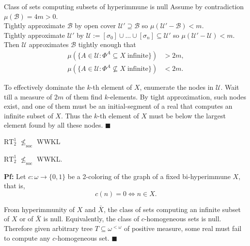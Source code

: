 \begin{frame}{Class of sets computing subsets of hyperimmune is null}
  Assume by contradiction $\mu(\mathcal{B})=4m>0$.\\
  Tightly approximate $\mathcal{B}$ by open cover
  $\mathcal{U}'\supseteq\mathcal{B}$ so
  $\mu(\mathcal{U}'-\mathcal{B})<m$.\\
  Tightly approximate $\mathcal{U}'$ by $\mathcal{U} :=[\sigma_0] \cup
  \ldots\cup[\sigma_n] \subseteq\mathcal{U}'$ so
  $\mu(\mathcal{U}'-\mathcal{U}) <m$.\\
  Then $\mathcal{U}$ approximates $\mathcal{B}$ tightly enough that
  \begin{align*}
    \mu(\{A\in\mathcal{U}: \Phi^A \subseteq X\; \text{infinite}\}) &>2m,\\
    \mu(\{A\in\mathcal{U}: \Phi^A \not\subseteq X\; \text{infinite}\}) &<2m.
  \end{align*}

  To effectively dominate the $k$-th element of $X$, enumerate the nodes in
  $\mathcal{U}$. Wait till a measure of $2m$ of them find $k$-elements. By
  tight approximation, such nodes exist, and one of them must be an
  initial-segment of a real that computes an infinite subset of $X$. Thus
  the $k$-th element of $X$ must be below the largest element found by all
  these nodes. $\blacksquare$
\end{frame}

\begin{frame}{$\text{RT}_2^1$ $\nleq_{\text{soc}}$ WWKL}
  \begin{thm}
    $\text{RT}_2^1$ $\nleq_{\text{soc}}$ WWKL.
  \end{thm}

  \vspace{1em}
  \textbf{Pf:} Let $c:\omega\rightarrow\{0,1\}$ be a 2-coloring of the
  graph of a fixed bi-hyperimmune $X$, that is,
  \[c(n)=0 \Leftrightarrow n\in X.\]
  
  From hyperimmunity of $X$ and $\bar{X}$, the class of sets computing an
  infinite subset of $X$ or of $\bar{X}$ is null. Equivalently, the class
  of $c$-homogeneous sets is null. Therefore given arbitrary tree
  $T\subseteq\omega^{<\omega}$ of positive measure, some real must fail to
  compute any $c$-homogeneous set. $\blacksquare$
\end{frame}

